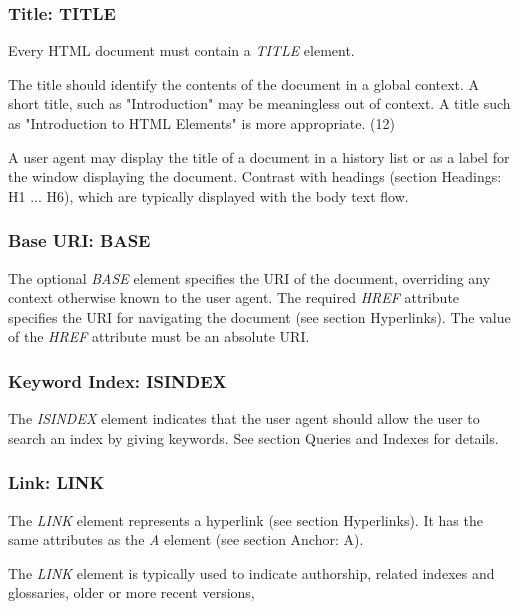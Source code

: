 \subsubsection*{Title:  TITLE}\par 
Every HTML document must contain a {\it TITLE} element.
\par \par 
The title should identify the contents of the document in a global
context.  A short title, such as "Introduction" may be meaningless out
of context.  A title such as "Introduction to HTML Elements" is more
appropriate.
(12)\par \par 
A user agent may display the title of a document in a history list
or as a label for the window displaying the document.  Contrast with
headings (section Headings:  H1 ...  H6), which are typically displayed with
the body text flow.
\par \subsubsection*{Base URI:  BASE}\par 
The optional {\it BASE} element specifies the URI of the document,
overriding any context otherwise known to the user agent.  The required
{\it HREF} attribute specifies the URI for navigating the document
(see section Hyperlinks).  The value of the {\it HREF} attribute
must be an absolute URI.
\par \subsubsection*{Keyword Index:  ISINDEX}\par 
The {\it ISINDEX} element indicates that the user agent should
allow the user to search an index by giving keywords.  See section Queries and Indexes for details.
\par \subsubsection*{Link:  LINK}\par 
The {\it LINK} element represents a hyperlink (see section Hyperlinks).  It has the same attributes as the {\it A} element
(see section Anchor:  A).
\par \par 
The {\it LINK} element is typically used to indicate authorship,
related indexes and glossaries, older or more recent versions,
